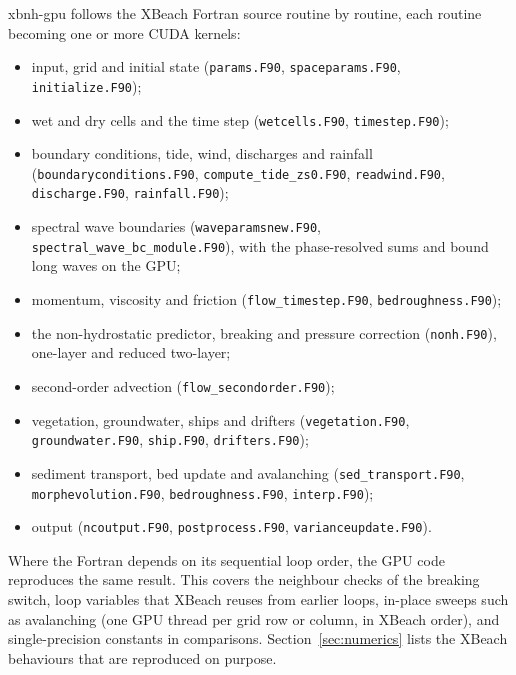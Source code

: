 \documentclass[11pt,a4paper]{article}
\newcommand{\code}[1]{\texttt{#1}}
\begin{document}
xbnh-gpu follows the XBeach Fortran source routine by routine, each routine becoming one or more CUDA
kernels:
\begin{itemize}
\item input, grid and initial state (\code{params.F90}, \code{spaceparams.F90}, \code{initialize.F90});
\item wet and dry cells and the time step (\code{wetcells.F90}, \code{timestep.F90});
\item boundary conditions, tide, wind, discharges and rainfall (\code{boundaryconditions.F90},
      \code{compute\_tide\_zs0.F90}, \code{readwind.F90}, \code{discharge.F90}, \code{rainfall.F90});
\item spectral wave boundaries (\code{waveparamsnew.F90}, \code{spectral\_wave\_bc\_module.F90}), with the
      phase-resolved sums and bound long waves on the GPU;
\item momentum, viscosity and friction (\code{flow\_timestep.F90}, \code{bedroughness.F90});
\item the non-hydrostatic predictor, breaking and pressure correction (\code{nonh.F90}), one-layer and
      reduced two-layer;
\item second-order advection (\code{flow\_secondorder.F90});
\item vegetation, groundwater, ships and drifters (\code{vegetation.F90}, \code{groundwater.F90},
      \code{ship.F90}, \code{drifters.F90});
\item sediment transport, bed update and avalanching (\code{sed\_transport.F90}, \code{morphevolution.F90},
      \code{bedroughness.F90}, \code{interp.F90});
\item output (\code{ncoutput.F90}, \code{postprocess.F90}, \code{varianceupdate.F90}).
\end{itemize}
Where the Fortran depends on its sequential loop order, the GPU code reproduces the same result. This
covers the neighbour checks of the breaking switch, loop variables that XBeach reuses from earlier loops,
in-place sweeps such as avalanching (one GPU thread per grid row or column, in XBeach order), and
single-precision constants in comparisons. Section~\ref{sec:numerics} lists the XBeach behaviours that are
reproduced on purpose.
\end{document}
